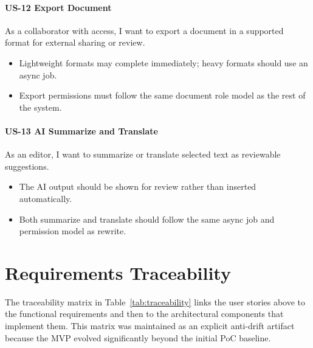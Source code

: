 \paragraph{US-12 Export Document} As a collaborator with access, I want to export a document in a supported
format for external sharing or review.
\begin{itemize}
  \item Lightweight formats may complete immediately; heavy formats should use an async job.
  \item Export permissions must follow the same document role model as the rest of the system.
\end{itemize}

\paragraph{US-13 AI Summarize and Translate} As an editor, I want to summarize or translate selected text as
reviewable suggestions.
\begin{itemize}
  \item The AI output should be shown for review rather than inserted automatically.
  \item Both summarize and translate should follow the same async job and permission model as rewrite.
\end{itemize}

\section{Requirements Traceability}

The traceability matrix in Table~\ref{tab:traceability} links the user stories above to the functional
requirements and then to the architectural components that implement them. This matrix was maintained as
an explicit anti-drift artifact because the MVP evolved significantly beyond the initial PoC baseline.



